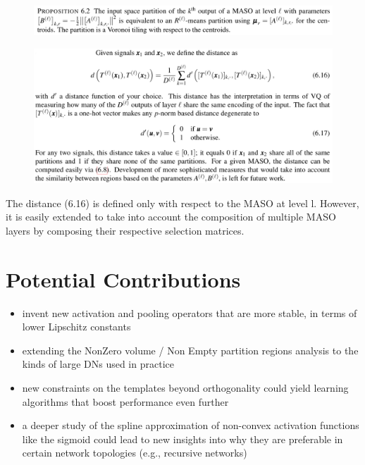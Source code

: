 \documentclass{article}
\begin{document}
\begin{figure}[h]
	\begin{center}
		\includegraphics[width=.8\linewidth]{Figure/prop6p1}
		\label{fig:prop6p1}
	\end{center}
\end{figure}




\begin{figure}[h]
	\begin{center}
		\includegraphics[width=.8\linewidth]{Figure/def_partitionRegionDistance}
		\label{fig:def_partitionRegionDistance}
	\end{center}
\end{figure}


The distance (6.16) is defined only with respect to the MASO at level l. However, it is easily extended to take into account the composition of multiple MASO layers by composing their respective selection matrices.


\section{Potential Contributions}

\begin{itemize}
	\item invent new activation and pooling operators that are more stable, in terms of lower Lipschitz constants
	\item extending the NonZero volume / Non Empty partition regions  analysis to the kinds of large DNs used in practice
	\item new constraints on the templates beyond orthogonality could yield learning algorithms that boost performance even further
	\item a deeper study of the spline approximation of non-convex activation functions like the sigmoid could lead to new insights into why they are preferable in certain network topologies (e.g., recursive networks)
\end{itemize}









\end{document}
